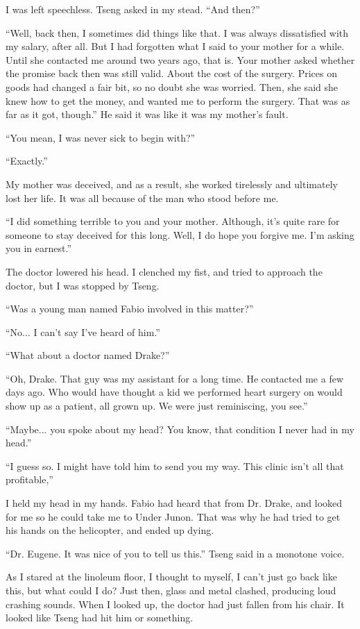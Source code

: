 \documentclass[oneside]{book}
\begin{document}
I was left speechless. Tseng asked in my stead. “And then?”

“Well, back then, I sometimes did things like that. I was always dissatisfied with my salary, after all. But I had forgotten what I said to your mother for a while. Until she contacted me around two years ago, that is. Your mother asked whether the promise back then was still valid. About the cost of the surgery. Prices on goods had changed a fair bit, so no doubt she was worried. Then, she said she knew how to get the money, and wanted me to perform the surgery. That was as far as it got, though.” He said it was like it was my mother’s fault.

“You mean, I was never sick to begin with?”

“Exactly.”

My mother was deceived, and as a result, she worked tirelessly and ultimately lost her life. It was all because of the man who stood before me.

“I did something terrible to you and your mother. Although, it’s quite rare for someone to stay deceived for this long. Well, I do hope you forgive me. I’m asking you in earnest.”

The doctor lowered his head. I clenched my fist, and tried to approach the doctor, but I was stopped by Tseng.

“Was a young man named Fabio involved in this matter?”

“No... I can’t say I’ve heard of him.”

“What about a doctor named Drake?”

“Oh, Drake. That guy was my assistant for a long time. He contacted me a few days ago. Who would have thought a kid we performed heart surgery on would show up as a patient, all grown up. We were just reminiscing, you see.”

“Maybe... you spoke about my head? You know, that condition I never had in my head.”

“I guess so. I might have told him to send you my way. This clinic isn’t all that profitable,”

I held my head in my hands. Fabio had heard that from Dr. Drake, and looked for me so he could take me to Under Junon. That was why he had tried to get his hands on the helicopter, and ended up dying.

“Dr. Eugene. It was nice of you to tell us this.” Tseng said in a monotone voice.

As I stared at the linoleum floor, I thought to myself, I can’t just go back like this, but what could I do? Just then, glass and metal clashed, producing loud crashing sounds. When I looked up, the doctor had just fallen from his chair. It looked like Tseng had hit him or something.
\end{document}
